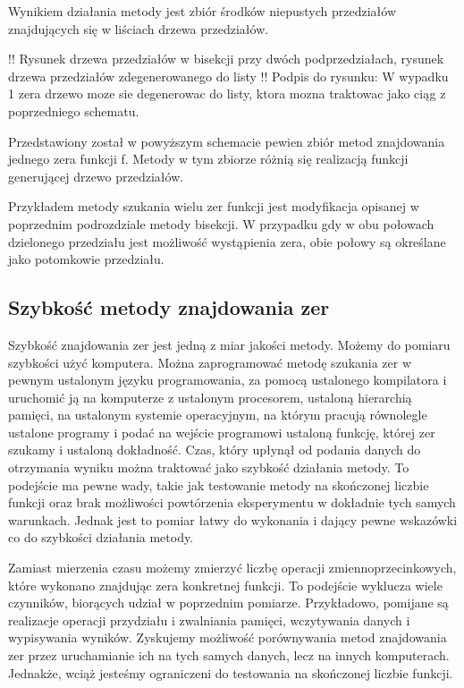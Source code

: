 \documentclass[11pt,a4paper,oneside]{report}
\begin{document}
Wynikiem działania metody jest zbiór środków niepustych przedziałów znajdujących się w liściach drzewa przedziałów.

!! Rysunek drzewa przedziałów w bisekcji przy dwóch podprzedziałach, rysunek drzewa przedziałów zdegenerowanego do listy
!! Podpis do rysunku: W wypadku 1 zera drzewo moze sie degenerowac do listy, ktora mozna traktowac jako ciąg z poprzedniego schematu.

Przedstawiony został w powyższym schemacie pewien zbiór metod znajdowania jednego zera funkcji f. Metody w tym zbiorze różnią się realizacją funkcji generującej drzewo przedziałów.

Przykładem metody szukania wielu zer funkcji jest modyfikacja opisanej w poprzednim podrozdziale metody bisekcji. W przypadku gdy w obu połowach dzielonego przedziału jest możliwość wystąpienia zera, obie połowy są określane jako potomkowie przedziału.

\subsection{Szybkość metody znajdowania zer}

Szybkość znajdowania zer jest jedną z miar jakości metody. Możemy do pomiaru szybkości użyć komputera. Można zaprogramować metodę szukania zer w pewnym ustalonym języku programowania, za pomocą ustalonego kompilatora i uruchomić ją na komputerze z ustalonym procesorem, ustaloną hierarchią pamięci, na ustalonym systemie operacyjnym, na którym pracują równolegle ustalone programy i podać na wejście programowi ustaloną funkcję, której zer szukamy i ustaloną dokładność. Czas, który upłynął od podania danych do otrzymania wyniku można traktować jako szybkość działania metody. To podejście ma pewne wady, takie jak testowanie metody na skończonej liczbie funkcji oraz brak możliwości powtórzenia eksperymentu w dokładnie tych samych warunkach. Jednak jest to pomiar łatwy do wykonania i dający pewne wskazówki co do szybkości działania metody.

Zamiast mierzenia czasu możemy zmierzyć liczbę operacji zmiennoprzecinkowych, które wykonano znajdując zera konkretnej funkcji. To podejście wyklucza wiele czynników, biorących udział w poprzednim pomiarze. Przykładowo, pomijane są realizacje operacji przydziału i zwalniania pamięci, wczytywania danych i wypisywania wyników. Zyskujemy możliwość porównywania metod znajdowania zer przez uruchamianie ich na tych samych danych, lecz na innych komputerach. Jednakże, wciąż jesteśmy ograniczeni do testowania na skończonej liczbie funkcji. 
\end{document}
